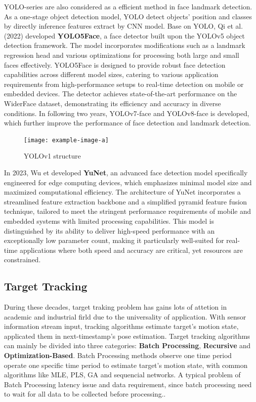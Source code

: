 YOLO-series\cite{Redmon_2016_CVPR} are also considered as a efficient method in face landmark detection. As a one-stage object detection model, YOLO detect objects' position and classes by directly inference features extract by CNN model. Base on YOLO, Qi et al. (2022) developed \textbf{YOLO5Face}\cite{Qi2022YOLO5Face}, a face detector built upon the YOLOv5 object detection framework. The model incorporates modifications such as a landmark regression head and various optimizations for processing both large and small faces effectively. YOLO5Face is designed to provide robust face detection capabilities across different model sizes, catering to various application requirements from high-performance setups to real-time detection on mobile or embedded devices. The detector achieves state-of-the-art performance on the WiderFace dataset, demonstrating its efficiency and accuracy in diverse conditions. In following two years, YOLOv7-face\cite{YOLOv7Face} and YOLOv8-face\cite{YOLOv8Face} is developed, which further improve the performance of face detection and landmark detection.

\begin{figure}[htb]
    \centering
    \texttt{[image: example-image-a]}
    \caption{YOLOv1 structure}\label{F:test-a}
\end{figure}

In 2023, Wu et developed \textbf{YuNet}\cite{Wu_2023}, an advanced face detection model specifically engineered for edge computing devices, which emphasizes minimal model size and maximized computational efficiency. The architecture of YuNet incorporates a streamlined feature extraction backbone and a simplified pyramid feature fusion technique, tailored to meet the stringent performance requirements of mobile and embedded systems with limited processing capabilities. This model is distinguished by its ability to deliver high-speed performance with an exceptionally low parameter count, making it particularly well-suited for real-time applications where both speed and accuracy are critical, yet resources are constrained.


\subsection{Target Tracking}
During these decades, target traking problem has gains lots of attetion in academic and industrial firld due to the universality of application. With sensor information stream input, tracking algorithms estimate target's motion state, applicated them in next-timestamp's pose estimation. Target tracking algorithms can mainly be divided into three categories: \textbf{Batch Processing}, \textbf{Recursive} and \textbf{Optimization-Based}\cite{KumarMondal2021}. Batch Processing methods observe one time period operate one specific time period to estimate target's motion state, with common algorithms like MLE, PLS, GA and sequencial networks. A typical problem of Batch Processing latency issue and data requirement, since batch processing need to wait for all data to be collected before processing.\cite{KumarMondal2021}. 

